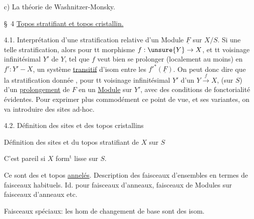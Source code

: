 c) La théorie de Washnitzer-Monsky.


\S\ 4 \uline{Topos stratifiant et topos cristallin.}

4.1. Interprétation d'une stratification relative d'un Module $\underline{F}$ sur $X/S$.
Si  une telle stratification, alors pour tt morphisme $f:\unsure{Y}\to X$, et tt voisinage infinitésimal $Y'$ de $Y$,   tel que $f$ veut bien se prolonger (localement au moins) en $f':Y'\mathbin{-}X$, un système \uline{transitif} d'isom entre les $f'^*(\underline{F})$.
On peut donc dire que la   stratification   donnée , pour tt voisinage infinitésimal $Y'$ d'un $Y\xrightarrow{f}X$, (sur $S$)  d'un \uline{prolongement}  de $F$ en un \uline{Module} sur $Y'$, avec des conditions de fonctorialité évidentes.
Pour exprimer plus commodément ce point de vue, et ses variantes, on va introduire des sites ad-hoc.


4.2. Définition des sites et des topos cristallins 

Définition des sites et du topos stratifiant de $X$ sur $S$

C'est pareil si $X$ form$^{\mathrm{t}}$ lisse sur $S$.

Ce sont des  et topos \uline{annelés}.
Description des  faisceaux d'ensembles en termes de faisceaux habituels. Id. pour faisceaux d'anneaux, faisceaux de Modules sur faisceaux d'anneaux etc.

Faisceaux spéciaux: les hom de changement de base sont des isom.


